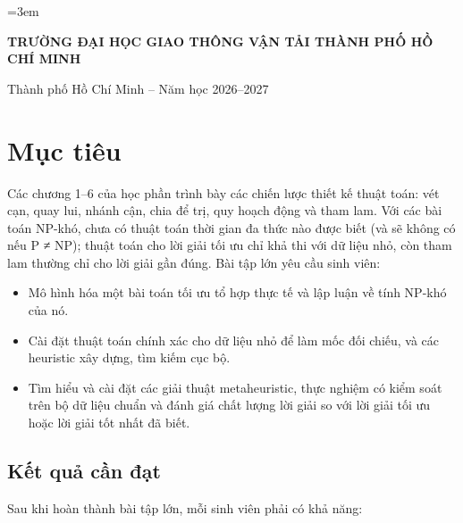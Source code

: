 \documentclass[a4paper,11pt]{article}
\begin{document}
\emergencystretch=3em
\begin{titlepage}
\centering
{\Large\bfseries TRƯỜNG ĐẠI HỌC GIAO THÔNG VẬN TẢI THÀNH PHỐ HỒ CHÍ MINH\par}
\vspace{0.5cm}{\large Ngành Công nghệ thông tin\par}
\vspace{4cm}{\LARGE\bfseries ĐỀ BÀI TẬP LỚN\par}
\vspace{0.5cm}{\Large\bfseries HỌC PHẦN: PHÂN TÍCH THIẾT KẾ GIẢI THUẬT\par}
\vspace{3cm}{\Large Chủ đề: Các bài toán NP-khó\\ và giải thuật metaheuristic\par}
\vfill Thành phố Hồ Chí Minh -- Năm học 2026--2027
\end{titlepage}
\renewcommand{\contentsname}{Mục lục}
\tableofcontents
\clearpage

\section{Mục tiêu}
Các chương 1–6 của học phần trình bày các chiến lược thiết kế thuật toán: vét cạn, quay lui, nhánh cận, chia để trị, quy hoạch động và tham lam. Với các bài toán NP-khó, chưa có thuật toán thời gian đa thức nào được biết (và sẽ không có nếu P ≠ NP); thuật toán cho lời giải tối ưu chỉ khả thi với dữ liệu nhỏ, còn tham lam thường chỉ cho lời giải gần đúng. Bài tập lớn yêu cầu sinh viên:

\begin{itemize}
\item Mô hình hóa một bài toán tối ưu tổ hợp thực tế và lập luận về tính NP-khó của nó.
\item Cài đặt thuật toán chính xác cho dữ liệu nhỏ để làm mốc đối chiếu, và các heuristic xây dựng, tìm kiếm cục bộ.
\item Tìm hiểu và cài đặt các giải thuật metaheuristic, thực nghiệm có kiểm soát trên bộ dữ liệu chuẩn và đánh giá chất lượng lời giải so với lời giải tối ưu hoặc lời giải tốt nhất đã biết.
\end{itemize}
\subsection{Kết quả cần đạt}
Sau khi hoàn thành bài tập lớn, mỗi sinh viên phải có khả năng:
\end{document}
